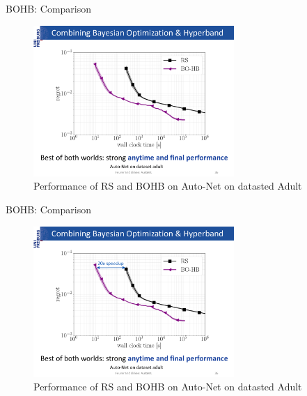 \begin{frame}{BOHB: Comparison}
\begin{figure}
    \centering
    \includegraphics[width=0.68\textwidth]{../w07_hpo_speedup/images/bohb/BOHB_1.pdf}
    \caption{Performance of RS and BOHB on Auto-Net on datasted Adult}
\end{figure}

\end{frame}
\begin{frame}{BOHB: Comparison}
\begin{figure}
    \centering
    \includegraphics[width=0.68\textwidth]{../w07_hpo_speedup/images/bohb/BOHB_2.pdf}
    \caption{Performance of RS and BOHB on Auto-Net on datasted Adult}
\end{figure}

\end{frame}
